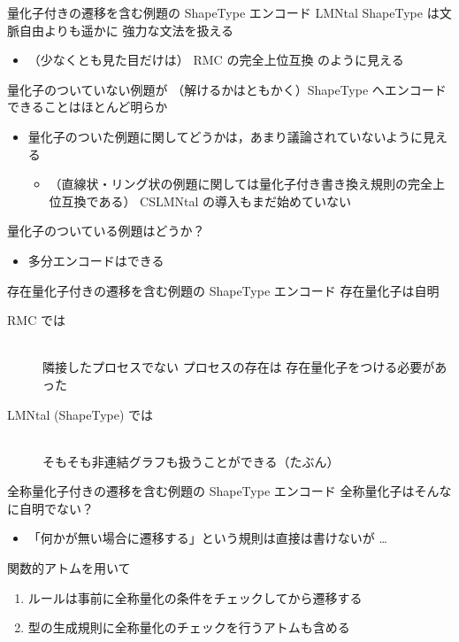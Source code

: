 \documentclass[presentation, xetex]{beamer}
\begin{document}
\begin{frame}[label={sec:orge5b0515}]{量化子付きの遷移を含む例題の ShapeType エンコード}
LMNtal ShapeType は文脈自由よりも遥かに \alert{\alert{強力な文法を扱える}}
\begin{itemize}
\item （少なくとも見た目だけは） \alert{\alert{RMC の完全上位互換}} のように見える
\end{itemize}


量化子のついていない例題が
（解けるかはともかく）ShapeType へエンコードできることはほとんど明らか
\begin{itemize}
\item 量化子のついた例題に関してどうかは，あまり議論されていないように見える
\begin{itemize}
\item （直線状・リング状の例題に関しては量化子付き書き換え規則の完全上位互換である）
CSLMNtal の導入もまだ始めていない
\end{itemize}
\end{itemize}


量化子のついている例題はどうか？
\begin{itemize}
\item 多分エンコードはできる
\end{itemize}
\end{frame}



\begin{frame}[label={sec:orgb626b9e}]{存在量化子付きの遷移を含む例題の ShapeType エンコード}
存在量化子は自明
\begin{description}
\item[{RMC では}] \mbox{}\\
\alert{\alert{隣接したプロセスでない}} プロセスの存在は
存在量化子をつける必要があった
\item[{LMNtal (ShapeType) では}] \mbox{}\\
そもそも非連結グラフも扱うことができる（たぶん）
\end{description}
\end{frame}


\begin{frame}[label={sec:orgdca530c}]{全称量化子付きの遷移を含む例題の ShapeType エンコード}
全称量化子はそんなに自明でない？
\begin{itemize}
\item 「何かが無い場合に遷移する」という規則は直接は書けないが \dots{}
\end{itemize}


関数的アトムを用いて
\begin{enumerate}
\item ルールは事前に全称量化の条件をチェックしてから遷移する
\item 型の生成規則に全称量化のチェックを行うアトムも含める
\end{enumerate}
\end{frame}
\end{document}

